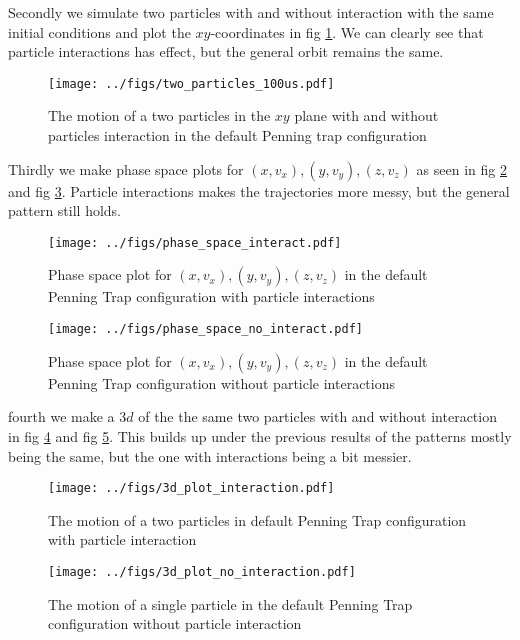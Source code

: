 \documentclass[english,notitlepage,reprint,nofootinbib]{revtex4-1}  %
\begin{document}
Secondly we simulate two particles with and without interaction with the same initial conditions and plot the $xy$-coordinates in fig \ref{fig:particles_xy}. We can clearly see that particle interactions has effect, but the general orbit remains the same.

\begin{figure}[H]
	\centering
	\texttt{[image: ../figs/two\_particles\_100us.pdf]} %
	\caption{The motion of a two particles in the $xy$ plane with and without particles interaction in the default Penning trap configuration}
	\label{fig:particles_xy}
\end{figure}

Thirdly we make phase space plots for $(x, v_x), (y, v_y), (z, v_z)$ as seen in fig \ref{fig:phase_y} and fig \ref{fig:phase_n}. Particle interactions makes the trajectories more messy, but the general pattern still holds.

\begin{figure}[H]
	\centering
	\texttt{[image: ../figs/phase\_space\_interact.pdf]} %
	\caption{Phase space plot for $(x, v_x), (y, v_y), (z, v_z)$ in the default Penning Trap configuration with particle interactions}
	\label{fig:phase_y}
\end{figure}
\begin{figure}[H]
	\centering
	\texttt{[image: ../figs/phase\_space\_no\_interact.pdf]}
	\caption{Phase space plot for $(x, v_x), (y, v_y), (z, v_z)$ in the default Penning Trap configuration without particle interactions}
	\label{fig:phase_n}
\end{figure}

fourth we make a $3d$ of the the same two particles with and without interaction in fig \ref{fig:3di} and fig \ref{fig:3dni}. This builds up under the previous results of the patterns mostly being the same, but the one with interactions being a bit messier.

\begin{figure}[h!]
	\centering
	\texttt{[image: ../figs/3d\_plot\_interaction.pdf]} %
	\caption{The motion of a two particles in default Penning Trap configuration with particle interaction}
	\label{fig:3di}
\end{figure}

\begin{figure}[h!]
	\centering
	\texttt{[image: ../figs/3d\_plot\_no\_interaction.pdf]} %
	\caption{The motion of a single particle in the default Penning Trap configuration without particle interaction}
	\label{fig:3dni}
\end{figure}
\end{document}
